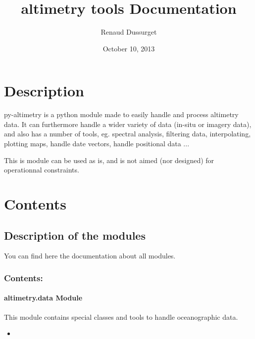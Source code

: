 \documentclass[letterpaper,10pt,english]{sphinxmanual}
\title{altimetry tools Documentation}
\date{October 10, 2013}
\author{Renaud Dussurget}
\begin{document}
\maketitle
\tableofcontents
{}\label{index::doc}



\chapter{Description}
\label{index:description}\label{index:welcome-to-altimetry-tools-s-documentation}
py-altimetry is a python module made to easily handle and process altimetry data.
It can furthermore handle a wider variety of data (in-situ or imagery data), and also has a number of tools, eg. spectral analysis, filtering data, interpolating, plotting maps, handle date vectors, handle positional data ...

This is module can be used as is, and is not aimed (nor designed) for operationnal constraints.


\chapter{Contents}
\label{index:contents}

\section{Description of the modules}
\label{Modules:description-of-the-modules}\label{Modules::doc}
You can find here the documentation about all modules.


\subsection{Contents:}
\label{Modules:contents}

\subsubsection{altimetry.data Module}
\label{altimetry.data:altimetry-data-module}\label{altimetry.data::doc}
This module contains special classes and tools to handle oceanographic data.
\begin{itemize}\setlength{\itemsep}{0pt}\setlength{\parskip}{0pt}
\item {} 

\end{itemize}
\end{document}
